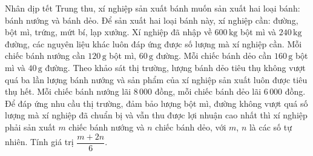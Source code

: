 \begin{bt}%
	Nhân dịp tết Trung thu, xí nghiệp sản xuất bánh muốn sản xuất hai loại bánh: bánh nướng và bánh dẻo. Để sản xuất hai loại bánh này, xí nghiệp cần: đường, bột mì, trứng, mứt bí, lạp xưởng. Xí nghiệp đã nhập về $600\,\mathrm{kg}$ bột mì và $240\,\mathrm{kg}$ đường, các nguyên liệu khác luôn đáp ứng được số lượng mà xí nghiệp cần. Mỗi chiếc bánh nướng cần $120\,\mathrm{g}$ bột mì, $60\,\mathrm{g}$ đường. Mỗi chiếc bánh dẻo cần $160\,\mathrm{g}$ bột mì và $40\,\mathrm{g}$ đường. Theo khảo sát thị trường, lượng bánh dẻo tiêu thụ không vượt quá ba lần lượng bánh nướng và sản phẩm của xí nghiệp sản xuất luôn được tiêu thụ hết. Mỗi chiếc bánh nướng lãi $8\,000$ đồng, mỗi chiếc bánh dẻo lãi $6\,000$ đồng. Để đáp ứng nhu cầu thị trường, đảm bảo lượng bột mì, đường không vượt quá số lượng mà xí nghiệp đã chuẩn bị và vẫn thu được lợi nhuận cao nhất thì xí nghiệp phải sản xuất $m$ chiếc bánh nướng và $n$ chiếc  bánh dẻo, với $m$, $n$ là các số tự nhiên. Tính giá trị $\dfrac{m+2n}{6}$.
\end{bt}
